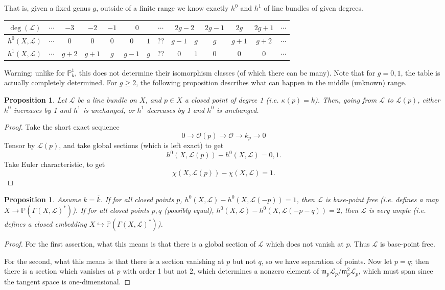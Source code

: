 \documentclass[10pt]{article}
\newtheorem{prop}[thm]{Proposition}
\theoremstyle{definition}
\newcommand{\mf}{\mathfrak}
\newcommand{\PP}{\mathbb{P}}
\newcommand{\OO}{\mathcal{O}}
\newcommand{\LL}{\mathcal{L}}
\begin{document}
That is, given a fixed genus $g$, outside of a finite range we know exactly $h^0$ and $h^1$ of line bundles of given degrees.
\begin{center}
\begin{tabular}{c|c|c|c|c|c:c|c|c:c|c|c|c|c|}
$\deg(\LL)$ & $\cdots$ & $-3$ & $-2$ & $-1$ &  & $\cdots$ &  & $2g-1$& $2g$& $2g+1$ &$\cdots$ \\ \hline
$h^0(X, \LL)$& $\cdots$&$0$&$0$&$0$&$0$&$1$& ?? & $g-1$&$g$&$g$&$g+1$&$g+2$&$\cdots$\\
$h^1(X,\LL)$ & $\cdots$ &$g+2$& $g+1$ & $g$&$g-1$&$g$&?? & $0$&$1$&$0$&$0$&$0$&$\cdots$\\
\end{tabular}
\end{center}
Warning: unlike for $\PP^1_k$, this does not determine their isomorphism classes (of which there can be many).  Note that for $g=0, 1$, the table is actually completely determined.  For $g \geq 2$, the following proposition describes what can happen in the middle (unknown) range.
\begin{prop}
Let $\LL$ be a line bundle on $X$, and $p \in X$ a closed point of degree 1 (i.e. $\kappa(p) = k$).  Then, going from $\LL$ to $\LL(p)$, either $h^0$ increases by 1 and $h^1$ is unchanged, or $h^1$ decreases by 1 and $h^0$ is unchanged.
\end{prop}
\begin{proof}
Take the short exact sequence
$$0 \rightarrow \OO(p) \rightarrow \OO \rightarrow k_{p} \rightarrow 0$$
Tensor by $\LL(p)$, and take global sections (which is left exact) to get
$$h^0(X, \LL(p)) - h^0(X, \LL) = 0, 1.$$
Take Euler characteristic, to get
$$\chi(X, \LL(p)) - \chi(X, \LL) = 1.$$
\end{proof}



\begin{prop}
Assume $k = \overline{k}$.  If for all closed points $p$, $h^0(X, \LL) - h^0(X, \LL(-p)) = 1$, then $\LL$ is base-point free (i.e. defines a map $X \rightarrow \mathbb{P}(\Gamma(X, \LL)^*)$).  If for all closed points $p, q$ (possibly equal), $h^0(X, \LL) - h^0(X, \LL(-p-q)) = 2$, then $\LL$ is very ample (i.e. defines a closed embedding $X \hookrightarrow \mathbb{P}(\Gamma(X, \LL)^*)$).
\end{prop}
\begin{proof}
For the first assertion, what this means is that there is a global section of $\LL$ which does not vanish at $p$.  Thus $\LL$ is base-point free.

For the second, what this means is that there is a section vanishing at $p$ but not $q$, so we have separation of points.  Now let $p = q$; then there is a section which vanishes at $p$ with order 1 but not 2, which determines a nonzero element of $\mf{m}_p\LL_p/\mf{m}_p^2 \LL_p$, which must span since the tangent space is one-dimensional.
\end{proof}
\end{document}
